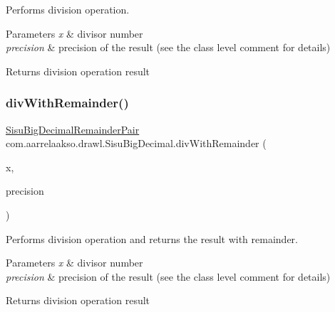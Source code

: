 Performs division operation. 


\begin{DoxyParams}{Parameters}
{\em x} & divisor number \\
\hline
{\em precision} & precision of the result (see the class level comment for details) \\
\hline
\end{DoxyParams}
\begin{DoxyReturn}{Returns}
division operation result 
\end{DoxyReturn}
\mbox{\label{classcom_1_1aarrelaakso_1_1drawl_1_1_sisu_big_decimal_a21e09234efca516798b5bd745fccad41}} 
\subsubsection{\texorpdfstring{div\+With\+Remainder()}{divWithRemainder()}\hspace{0.1cm}{\footnotesize\ttfamily [1/2]}}
{\footnotesize\ttfamily \hyperlink{classcom_1_1aarrelaakso_1_1drawl_1_1_sisu_big_decimal_remainder_pair}{Sisu\+Big\+Decimal\+Remainder\+Pair} com.\+aarrelaakso.\+drawl.\+Sisu\+Big\+Decimal.\+div\+With\+Remainder (\begin{DoxyParamCaption}\item[{\hyperlink{classcom_1_1aarrelaakso_1_1drawl_1_1_sisu_big_decimal}{Sisu\+Big\+Decimal}}]{x,  }\item[{int}]{precision }\end{DoxyParamCaption})\hspace{0.3cm}{\ttfamily [protected]}}



Performs division operation and returns the result with remainder. 


\begin{DoxyParams}{Parameters}
{\em x} & divisor number \\
\hline
{\em precision} & precision of the result (see the class level comment for details) \\
\hline
\end{DoxyParams}
\begin{DoxyReturn}{Returns}
division operation result 
\end{DoxyReturn}
\mbox{\label{classcom_1_1aarrelaakso_1_1drawl_1_1_sisu_big_decimal_a8707dfd3e59cee5e599d6a8a469b7f0d}} 
